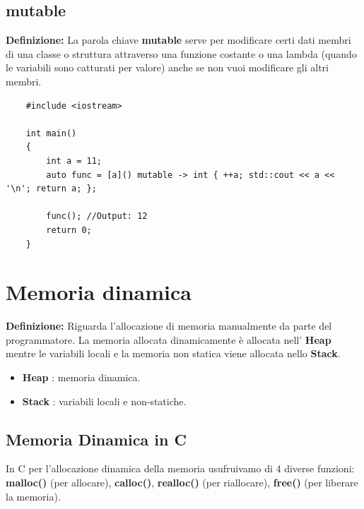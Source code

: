 
\subsection{mutable}

\textsf{\small \textbf{Definizione: } La parola chiave \textbf{mutable} serve per modificare certi dati membri di una classe o struttura attraverso una funzione costante o una lambda (quando le variabili sono catturati per valore) anche se non vuoi modificare gli altri membri.} \\

\begin{lstlisting}
	#include <iostream>
	
	int main()
	{
		int a = 11;
		auto func = [a]() mutable -> int { ++a; std::cout << a << '\n'; return a; };
		
		func(); //Output: 12
		return 0;
	}
\end{lstlisting}



\newpage

\section{Memoria dinamica}

\textsf{\small \textbf{Definizione: } Riguarda l'allocazione di memoria manualmente da parte del programmatore. La memoria allocata dinamicamente è allocata nell' \textbf{Heap} mentre le variabili locali e la memoria non statica viene allocata nello \textbf{Stack}.}

\begin{itemize}
	\item \textsf{\small \textbf{Heap} : memoria dinamica.}
	\item \textsf{\small \textbf{Stack} : variabili locali e non-statiche.}
\end{itemize}

\subsection{Memoria Dinamica in C}

\textsf{\small In C per l'allocazione dinamica della memoria usufruivamo di 4 diverse funzioni: \textbf{malloc()} (per allocare), \textbf{calloc()}, \textbf{realloc()} (per riallocare), \textbf{free()} (per liberare la memoria).} \\

